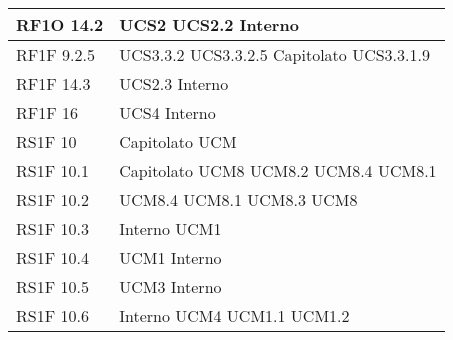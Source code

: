 \begin{center}
\begin{longtable}{ | p{5cm} | p{5cm} |}
        RF1O 14.2 &  UCS2 \newline  UCS2.2 \newline  Interno \newline  \\ \hline      
        RF1F 9.2.5 &  UCS3.3.2 \newline  UCS3.3.2.5 \newline  Capitolato \newline  UCS3.3.1.9 \newline  \\ \hline      
        RF1F 14.3 &  UCS2.3 \newline  Interno \newline  \\ \hline      
        RF1F 16 &  UCS4 \newline  Interno \newline  \\ \hline      
        RS1F 10 &  Capitolato \newline  UCM \newline  \\ \hline      
        RS1F 10.1 &  Capitolato \newline  UCM8 \newline  UCM8.2 \newline  UCM8.4 \newline  UCM8.1 \newline  \\ \hline      
        RS1F 10.2 &  UCM8.4 \newline  UCM8.1 \newline  UCM8.3 \newline  UCM8 \newline  \\ \hline      
        RS1F 10.3 &  Interno \newline  UCM1 \newline  \\ \hline      
        RS1F 10.4 &  UCM1 \newline  Interno \newline  \\ \hline      
        RS1F 10.5 &  UCM3 \newline  Interno \newline  \\ \hline      
        RS1F 10.6 &  Interno \newline  UCM4 \newline  UCM1.1 \newline  UCM1.2 \newline  \\ \hline      

\end{longtable}
\end{center}

